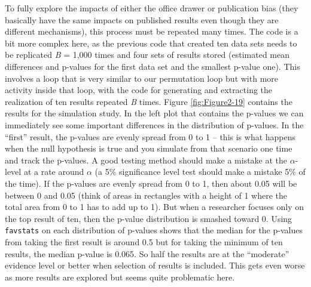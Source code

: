 \documentclass[
]{book}
\begin{document}
\indent To fully explore the impacts of either the office drawer or publication bias (they basically have the same impacts on published results even though they are different mechanisms), this process must be repeated many times. The code is a bit more complex here, as the previous code that created ten data sets needs to be replicated \emph{B} = 1,000 times and four sets of results stored (estimated mean differences and p-values for the first data set and the smallest p-value one). This involves a loop that is very similar to our permutation loop but with more activity inside that loop, with the code for generating and extracting the realization of ten results repeated \emph{B} times. Figure \ref{fig:Figure2-19} contains the results for the simulation study. In the left plot that contains the p-values we can immediately see some important differences in the distribution of p-values. In the ``first'' result, the p-values are evenly spread from 0 to 1 -- this is what happens when the null hypothesis is true and you simulate from that scenario one time and track the p-values. A good testing method should make a mistake at the \(\alpha\)-level at a rate around \(\alpha\) (a 5\% significance level test should make a mistake 5\% of the time). If the p-values are evenly spread from 0 to 1, then about 0.05 will be between 0 and 0.05 (think of areas in rectangles with a height of 1 where the total area from 0 to 1 has to add up to 1). But when a researcher focuses only on the top result of ten, then the p-value distribution is smashed toward 0. Using \texttt{favstats} on each distribution of p-values shows that the median for the p-values from taking the first result is around 0.5 but for taking the minimum of ten results, the median p-value is 0.065. So half the results are at the ``moderate'' evidence level or better when selection of results is included. This gets even worse as more results are explored but seems quite problematic here.
\end{document}
